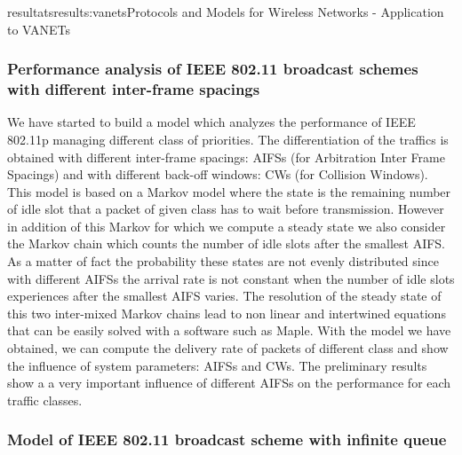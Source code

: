\documentclass{ra2016}
\begin{document}
\begin{module}{resultats}{results:vanets}{Protocols and Models for Wireless Networks - Application to VANETs}

\subsubsection{Performance analysis of IEEE 802.11 broadcast schemes with different inter-frame spacings}

\begin{participants}
\end{participants}

We have started to build a model which analyzes the performance 
of IEEE 802.11p managing different class of priorities. 
The differentiation of the traffics is obtained with different 
inter-frame spacings:  AIFSs (for Arbitration Inter Frame Spacings) and with 
different back-off windows: CWs (for Collision Windows). 
This model is based on a Markov model where the state is the remaining 
number of idle slot that a packet of given class has to wait before transmission. 
However in addition of this Markov for which we compute a steady state 
we also consider the Markov chain which counts the number of idle slots after 
the smallest AIFS. As a matter of fact the probability these states are not evenly 
distributed since with different AIFSs the arrival rate is not constant 
when the number of idle slots experiences after the smallest AIFS varies. 
The resolution of the steady state of this two inter-mixed Markov chains
lead to non linear and intertwined equations that can be easily  solved with a software 
such as Maple. 
With the model we have obtained, we can compute the delivery rate 
of packets of different class and show the influence of system parameters: 
AIFSs and CWs. The preliminary results show a a very important influence 
of different AIFSs on the performance for each traffic classes.  

\subsubsection{Model of IEEE 802.11 broadcast scheme with infinite queue}

\begin{participants}
\end{participants}


\end{module}
\end{document}
